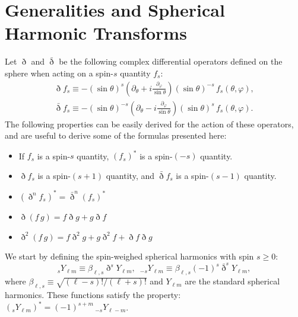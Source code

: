 \documentclass[usenatbib]{mnrasb}
\begin{document}



\appendix

  \section{Generalities and Spherical Harmonic Transforms}\label{app:shts}
    Let $\eth$ and $\bar{\eth}$ be the following complex differential operators defined on the sphere when acting on a spin-$s$ quantity $f_s$:
    \begin{equation}
      \begin{split}
        \eth f_s\equiv-(\sin\theta)^s\left(\partial_\theta+i\frac{\partial_\varphi}{\sin\theta}\right)(\sin\theta)^{-s}\,f_s(\theta,\varphi), \\
        \bar{\eth} f_s\equiv-(\sin\theta)^{-s}\left(\partial_\theta-i\frac{\partial_\varphi}{\sin\theta}\right)(\sin\theta)^{s}\,f_s(\theta,\varphi).
      \end{split}
    \end{equation}
    The following properties can be easily derived for the action of these operators, and are useful to derive some of the formulas presented here:
    \begin{itemize}
      \item If $f_s$ is a spin-$s$ quantity, $(f_s)^*$ is a spin-$(-s)$ quantity.
      \item $\eth f_s$ is a spin-$(s+1)$ quantity, and $\bar{\eth} f_s$ is a spin-$(s-1)$ quantity.
      \item $(\eth^nf_s)^*=\bar{\eth}^n(f_s)^*$
      \item $\eth(f\,g)=f\eth g+g\eth f$
      \item $\eth^2(f\,g)=f\eth^2g+g\eth^2f+\eth f\eth g$
    \end{itemize}
    
    We start by defining the spin-weighed spherical harmonics with spin $s\geq0$:
    \begin{equation}
      _sY_{\ell m}\equiv \beta_{\ell,s} \eth^s Y_{\ell m},\hspace{6pt}
      _{-s}Y_{\ell m}\equiv \beta_{\ell,s} (-1)^s\bar{\eth}^s Y_{\ell m},
    \end{equation}
    where $\beta_{\ell,s}\equiv\sqrt{(\ell-s)!/(\ell+s)!}$ and $Y_{\ell m}$ are the standard spherical harmonics. These functions satisfy the property: $(_sY_{\ell m})^*=(-1)^{s+m}\,_{-s}Y_{\ell-m}$. 
            
\end{document}
